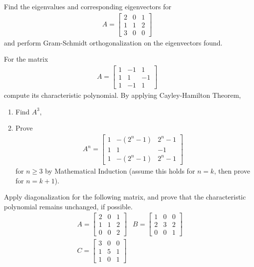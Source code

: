 \begin{Exercise}
Find the eigenvalues and corresponding eigenvectors for
\begin{align*}
A =
\begin{bmatrix}
2 & 0 & 1\\
1 & 1 & 2\\
3 & 0 & 0
\end{bmatrix}
\end{align*}
and perform Gram-Schmidt orthogonalization on the eigenvectors found.
\end{Exercise}

\begin{Exercise}
For the matrix 
\begin{align*}
A = 
\begin{bmatrix}
1 & -1 & 1\\
1 & 1 & -1\\
1 & -1 & 1
\end{bmatrix}
\end{align*}
compute its characteristic polynomial. By applying Cayley-Hamilton Theorem,
\begin{enumerate}[label=(\alph*)]
\item Find $A^{3}$,
\item Prove 
\begin{align*}
A^{n} = \begin{bmatrix}
1 & -(2^n-1) & 2^n-1\\
1 & 1 & -1\\
1 & -(2^n-1) & 2^n-1
\end{bmatrix}
\end{align*}
for $n \geq 3$ by Mathematical Induction (assume this holds for $n = k$, then prove for $n = k+1$).
\end{enumerate}
\end{Exercise}

\begin{Exercise}
Apply diagonalization for the following matrix, and prove that the characteristic polynomial remains unchanged, if possible.
\begin{align*}
&A =
\begin{bmatrix}
2 & 0 & 1\\
1 & 1 & 2\\
0 & 0 & 2
\end{bmatrix} 
&B =
\begin{bmatrix}
1 & 0 & 0\\
2 & 3 & 2\\
0 & 0 & 1
\end{bmatrix} \\
&C = 
\begin{bmatrix}
3 & 0 & 0\\
1 & 5 & 1\\
1 & 0 & 1
\end{bmatrix} 
\end{align*}
\end{Exercise}

